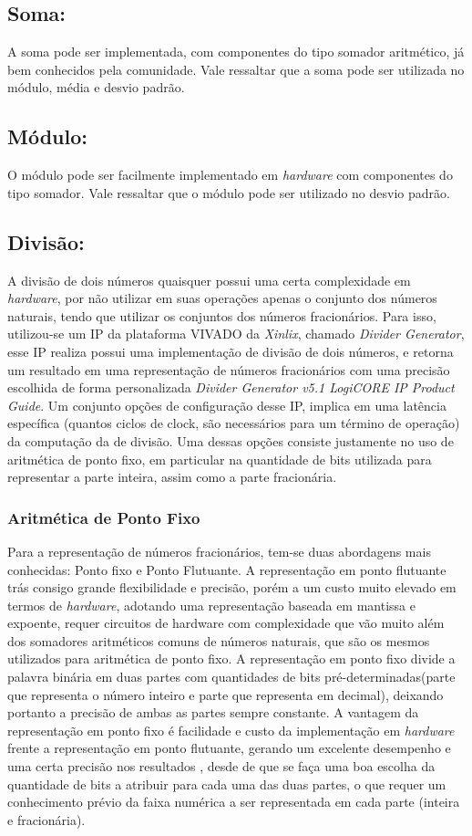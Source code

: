 \subsection{Soma:} A soma pode ser implementada, com componentes do tipo somador aritmético, já bem conhecidos pela comunidade. Vale ressaltar que a soma pode ser utilizada no módulo, média e desvio padrão.
\subsection{Módulo:} O módulo pode ser facilmente implementado em \textit{hardware} com componentes do tipo somador. Vale ressaltar que o módulo pode ser utilizado no desvio padrão.
\subsection{Divisão:} A divisão de dois números quaisquer possui uma certa complexidade em \textit{hardware}, por não utilizar em suas operações apenas o conjunto dos números naturais, tendo que utilizar os conjuntos dos números fracionários. Para isso, utilizou-se um IP da plataforma VIVADO da \textit{Xinlix}, chamado \textit{Divider Generator}, esse IP realiza possui uma implementação de divisão de dois números, e retorna um resultado em uma representação de números fracionários com uma precisão escolhida de forma personalizada \textit{Divider Generator v5.1 LogiCORE IP Product Guide}. Um conjunto opções de configuração desse IP, implica em uma latência específica (quantos ciclos de clock, são necessários para um término de operação) da computação da de divisão. Uma dessas opções consiste justamente no uso de aritmética de ponto fixo, em particular na quantidade de bits utilizada para representar a parte inteira, assim como a parte fracionária.

\subsubsection{Aritmética de Ponto Fixo} 	

Para a representação de números fracionários, tem-se duas abordagens mais conhecidas: Ponto fixo e Ponto Flutuante. A representação em ponto flutuante trás consigo grande flexibilidade e precisão, porém a um custo muito elevado em termos de \textit{hardware}, adotando uma representação baseada em mantissa e expoente, requer circuitos de hardware com complexidade que vão muito além dos somadores aritméticos comuns de números naturais, que são os mesmos utilizados para aritmética de ponto fixo. A representação em ponto fixo divide a palavra binária em duas partes com quantidades de bits pré-determinadas(parte que representa o número inteiro e parte que representa em decimal), deixando portanto a precisão de ambas as partes sempre constante. A vantagem da representação em ponto fixo é facilidade e custo da implementação em \textit{hardware} frente a representação em ponto flutuante, gerando um excelente desempenho e uma certa precisão nos resultados \cite{woods2008reconfigurable}, desde de que se faça uma boa escolha da quantidade de bits a atribuir para cada uma das duas partes, o que requer um conhecimento prévio da faixa numérica a ser representada em cada parte (inteira e fracionária).

